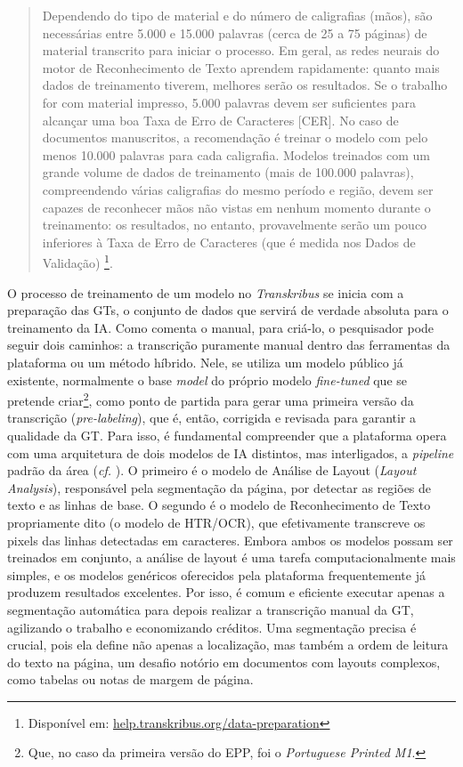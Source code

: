 \documentclass[portuguese]{textolivre}
\begin{document}
\begin{quote}
    Dependendo do tipo de material e do número de caligrafias (mãos), são necessárias entre 5.000 e 15.000 palavras (cerca de 25 a 75 páginas) de material transcrito para iniciar o processo. Em geral, as redes neurais do motor de Reconhecimento de Texto aprendem rapidamente: quanto mais dados de treinamento tiverem, melhores serão os resultados. Se o trabalho for com material impresso, 5.000 palavras devem ser suficientes para alcançar uma boa Taxa de Erro de Caracteres [CER]. No caso de documentos manuscritos, a recomendação é treinar o modelo com pelo menos 10.000 palavras para cada caligrafia. Modelos treinados com um grande volume de dados de treinamento (mais de 100.000 palavras), compreendendo várias caligrafias do mesmo período e região, devem ser capazes de reconhecer mãos não vistas em nenhum momento durante o treinamento: os resultados, no entanto, provavelmente serão um pouco inferiores à Taxa de Erro de Caracteres (que é medida nos Dados de Validação) \cite[tradução própria]{readcoop2025charactererror}\footnote{Disponível em: \url{help.transkribus.org/data-preparation}}.
\end{quote}

O processo de treinamento de um modelo no \textit{Transkribus} se inicia com a preparação das GTs, o conjunto de dados que servirá de verdade absoluta para o treinamento da IA. Como comenta o manual, para criá-lo, o pesquisador pode seguir dois caminhos: a transcrição puramente manual dentro das ferramentas da plataforma ou um método híbrido. Nele, se utiliza um modelo público já existente, normalmente o base \textit{model} do próprio modelo \textit{fine-tuned }que se pretende criar\footnote{Que, no caso da primeira versão do EPP, foi o \textit{Portuguese Printed M1}.}, como ponto de partida para gerar uma primeira versão da transcrição (\textit{pre-labeling}), que é, então, corrigida e revisada para garantir a qualidade da GT. Para isso, é fundamental compreender que a plataforma opera com uma arquitetura de dois modelos de IA distintos, mas interligados, a \textit{pipeline} padrão da área (\textit{cf.} \textcite[p.~15]{wang2021object}). O primeiro é o modelo de Análise de Layout (\textit{Layout Analysis}), responsável pela segmentação da página, por detectar as regiões de texto e as linhas de base. O segundo é o modelo de Reconhecimento de Texto propriamente dito (o modelo de HTR/OCR), que efetivamente transcreve os pixels das linhas detectadas em caracteres. Embora ambos os modelos possam ser treinados em conjunto, a análise de layout é uma tarefa computacionalmente mais simples, e os modelos genéricos oferecidos pela plataforma frequentemente já produzem resultados excelentes. Por isso, é comum e eficiente executar apenas a segmentação automática para depois realizar a transcrição manual da GT, agilizando o trabalho e economizando créditos. Uma segmentação precisa é crucial, pois ela define não apenas a localização, mas também a ordem de leitura do texto na página, um desafio notório em documentos com layouts complexos, como tabelas ou notas de margem de página.
\end{document}
